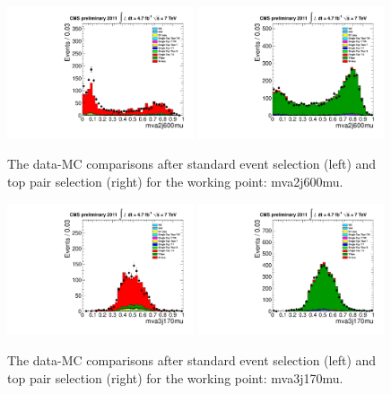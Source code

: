 \begin{figure}[!t]
  \centering
  \includegraphics[width=0.49\textwidth]{figs/cl-mva2j600mu-normal.pdf}
  \includegraphics[width=0.49\textwidth]{figs/cl-mva2j600mu-inTTbar.pdf}
  \caption{\label{fig:mva:plots-mva2j600mu} The data-MC comparisons
    after standard event selection (left) and top pair
    selection (right) for the working point: mva2j600mu.}
\end{figure}

\clearpage
\begin{figure}[!t]
  \centering
  \includegraphics[width=0.49\textwidth]{figs/cl-mva3j170mu-normal.pdf}
  \includegraphics[width=0.49\textwidth]{figs/cl-mva3j170mu-inTTbar.pdf}
  \caption{\label{fig:mva:plots-mva3j170mu} The data-MC comparisons
    after standard event selection (left) and top pair
    selection (right) for the working point: mva3j170mu.}
\end{figure}

